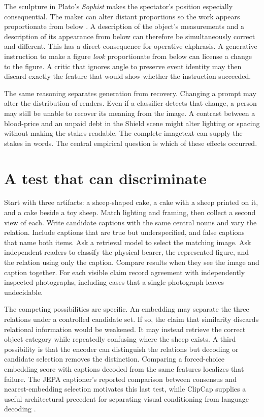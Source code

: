 \documentclass[11pt]{article}
\begin{document}
The sculpture in Plato's \emph{Sophist} makes the spectator's position especially consequential. The maker can alter distant proportions so the work appears proportionate from below \cite{platoSophistJowett}. A description of the object's measurements and a description of its appearance from below can therefore be simultaneously correct and different. This has a direct consequence for operative ekphrasis. A generative instruction to make a figure \emph{look} proportionate from below can license a change to the figure. A critic that ignores angle to preserve event identity may then discard exactly the feature that would show whether the instruction succeeded.

The same reasoning separates generation from recovery. Changing a prompt may alter the distribution of renders. Even if a classifier detects that change, a person may still be unable to recover its meaning from the image. A contrast between a blood-price and an unpaid debt in the Shield scene might alter lighting or spacing without making the stakes readable. The complete imagetext can supply the stakes in words. The central empirical question is which of these effects occurred.

\section{A test that can discriminate}
Start with three artifacts: a sheep-shaped cake, a cake with a sheep printed on it, and a cake beside a toy sheep. Match lighting and framing, then collect a second view of each. Write candidate captions with the same central nouns and vary the relation. Include captions that are true but underspecified, and false captions that name both items. Ask a retrieval model to select the matching image. Ask independent readers to classify the physical bearer, the represented figure, and the relation using only the caption. Compare results when they see the image and caption together. For each visible claim record agreement with independently inspected photographs, including cases that a single photograph leaves undecidable.

The competing possibilities are specific. An embedding may separate the three relations under a controlled candidate set. If so, the claim that similarity discards relational information would be weakened. It may instead retrieve the correct object category while repeatedly confusing where the sheep exists. A third possibility is that the encoder can distinguish the relations but decoding or candidate selection removes the distinction. Comparing a forced-choice embedding score with captions decoded from the same features localizes that failure. The JEPA captioner's reported comparison between consensus and nearest-embedding selection motivates this last test, while ClipCap supplies a useful architectural precedent for separating visual conditioning from language decoding \cite{balestriero2026platonic,mokady2021clipcap}.
\end{document}
